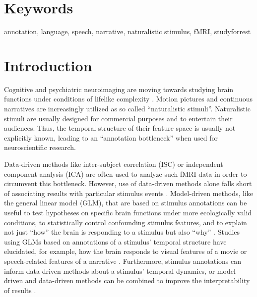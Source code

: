 \documentclass[10pt,a4paper,onecolumn]{article}
\begin{document}
\section*{Keywords}
annotation, language, speech, narrative, naturalistic stimulus, fMRI, studyforrest

\clearpage


\section*{Introduction}
Cognitive and psychiatric neuroimaging are moving towards studying brain
functions under conditions of lifelike complexity
\citep{sonkusare2019naturalistic, eickhoff2020towards}. Motion pictures
\citep{hasson2008neurocinematics} and continuous narratives
\citep{wilson2008beyond, lerner2011topographic} are increasingly utilized as so called ``naturalistic
stimuli''.
Naturalistic stimuli are usually designed for commercial purposes and to
entertain their audiences.
Thus, the temporal structure of their feature space is usually not explicitly
known, leading to an ``annotation bottleneck'' \citep{aliko2020naturalistic} when
used for neuroscientific research.

Data-driven methods like inter-subject correlation
(ISC)\citep{hasson2004intersubject} or independent component analysis
(ICA)\citep{bartels2004chronoarchitecture} are often used to analyze
such fMRI data in order to circumvent this bottleneck.
However, use of data-driven methods alone falls short of associating results with
particular stimulus events \citep{kauttonen2015optimizing}.
Model-driven methods, like the general linear model (GLM), that are based on
stimulus annotations can be useful to test hypotheses on specific brain
functions under more ecologically valid conditions, to statistically control
confounding stimulus features, and to explain not just ``how'' the brain is
responding to a stimulus but also ``why'' \citep{hamilton2018revolution}.
Studies using GLMs based on annotations of a stimulus' temporal structure have
elucidated, for example, how the brain responds to visual features of a movie
\citep{bartels2004mapping} or speech-related features of a narrative
\citep{rocca2020language}.
Furthermore, stimulus annotations can inform data-driven methods about a
stimulus' temporal dynamics, or model-driven and data-driven methods can be
combined to improve the interpretability of results \citep{lahnakoski2012stimulus}.
\end{document}
